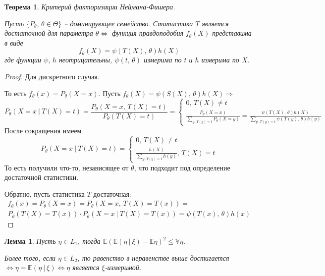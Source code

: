 \documentclass[a4paper,12pt]{article}
\renewcommand{\leq}{\ensuremath{\leqslant}}
\theoremstyle{plain}
\newtheorem{theorem}{Теорема}[section]
\newtheorem{lemma}{Лемма}[section]
\theoremstyle{definition}
\theoremstyle{remark}
\begin{document}
\begin{theorem}
  Критерий факторизации Неймана-Фишера.

  Пусть $\{P_\theta,\, \theta \in \Theta\}$ -- доминирующее семейство. Статистика $T$ является достаточной для параметра $\theta \Leftrightarrow$ функция правдоподобия $f_\theta(X)$ представима в виде
  \[
    f_\theta(X) = \psi(T(X),\, \theta)h(X)
  \]
  где функции $\psi,\, h$ неотрицательны, $\psi(t,\, \theta)$ измерима по $t$ и $h$ измерима по $X$.
\end{theorem}

\begin{proof}
  Для дискретного случая.

  То есть $f_\theta(x) = P_\theta(X = x)$. Пусть $f_\theta(X) = \psi(S(X),\, \theta)h(X) \Rightarrow$
  \[
    P_\theta(X = x \:\vert\: T(X) = t) = \frac{P_\theta(X = x,\, T(X) = t)}{P_\theta(T(X) = t)} = \begin{cases}
      0,\, T(X) \neq t\\
      \frac{P_\theta(X = x)}{\sum_{y :\: T(y) = t}P_\theta(X = y)} = \frac{\psi(T(X),\, \theta)h(X)}{\sum_{y :\: T(y) = t} \psi(T(y),\, \theta)h(y)}
    \end{cases} 
  \]
  После сокращения имеем
  \[
    P_\theta(X = x \:\vert\: T(X) = t) = \begin{cases}
      0,\, T(X) \neq t\\
      \frac{h(X)}{\sum_{y :\: T(y) = t} h(y)},\, T(X) = t
    \end{cases}
  \]
  То есть получили что-то, независящее от $\theta$, что подходит под определение достаточной статистики.

  Обратно, пусть статистика $T$ достаточная:
  \begin{align*}
    f_\theta(x) = P_\theta(X = x) = P_\theta(X = x,\, T(X) = T(x)) =\\ 
    P_\theta(T(X) = T(x))\cdot P_\theta(X = x \:\vert\: T(X) = T(x)) = \psi(T(x),\, \theta)h(x)
  \end{align*}
\end{proof}

\begin{lemma}\label{UMO_uneq}
  Пусть $\eta \in L_1$, тогда $\mathbb{E}(\mathbb{E}(\eta \:\vert\: \xi) - \mathbb{E}\eta)^2 \leq \mathbb{V}\eta$.

  Более того, если $\eta \in L_2$, то равенство в неравенстве выше достигается $\Leftrightarrow \eta = \mathbb{E}(\eta\:\vert\: \xi) \Leftrightarrow \eta$ является $\xi$-измеримой.
\end{lemma}
\end{document}
